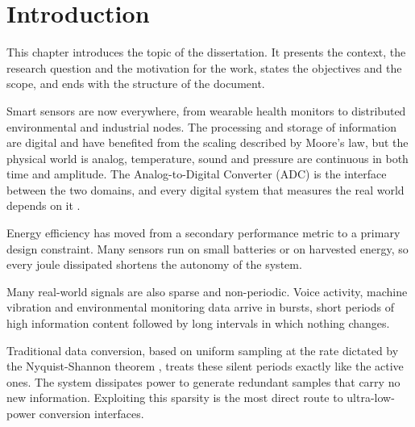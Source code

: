 % 
%
%



\chapter{Introduction} \label{chap:intro}

This chapter introduces the topic of the dissertation. It presents the context, the research question and the motivation for the work, states the objectives and the scope, and ends with the structure of the document.

Smart sensors are now everywhere, from wearable health monitors to distributed environmental and industrial nodes. The processing and storage of information are digital and have benefited from the scaling described by Moore's law, but the physical world is analog, temperature, sound and pressure are continuous in both time and amplitude. The Analog-to-Digital Converter (ADC) is the interface between the two domains, and every digital system that measures the real world depends on it \cite{johns_martin_2012}.

Energy efficiency has moved from a secondary performance metric to a primary design constraint. Many sensors run on small batteries or on harvested energy, so every joule dissipated shortens the autonomy of the system.

Many real-world signals are also sparse and non-periodic. Voice activity, machine vibration and environmental monitoring data arrive in bursts, short periods of high information content followed by long intervals in which nothing changes.

Traditional data conversion, based on uniform sampling at the rate dictated by the Nyquist-Shannon theorem \cite{shannon_1949}, treats these silent periods exactly like the active ones. The system dissipates power to generate redundant samples that carry no new information. Exploiting this sparsity is the most direct route to ultra-low-power conversion interfaces.

